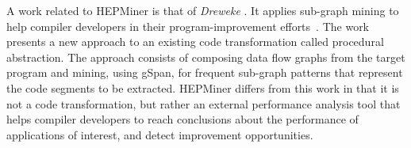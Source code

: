 A work related to HEPMiner is that of \emph{Dreweke \etal}. It applies sub-graph mining to help compiler developers in their program-improvement efforts~\cite{DrewekeCGO07}. The work presents a new approach to an existing code transformation called procedural abstraction. The approach consists of composing data flow graphs from the target program and mining, using gSpan, for frequent sub-graph patterns that represent the code segments to be extracted. HEPMiner differs from this work in that it is not a code transformation, but rather an external performance analysis tool that helps compiler developers to reach conclusions about the performance of applications of interest, and detect improvement opportunities. 
